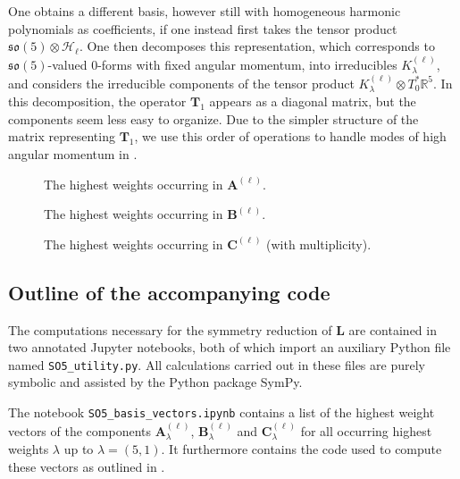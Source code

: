 \documentclass[11pt,reqno]{amsart}
\theoremstyle{remark}
\theoremstyle{definition}
\newcommand{\sov}{\mathfrak{so}(5)}
\begin{document}
One obtains a different basis, however still with homogeneous harmonic polynomials as coefficients, if one instead first takes the tensor product $\sov \otimes \mathcal H_\ell$. One then decomposes this representation, which corresponds to $\sov$-valued $0$-forms with fixed angular momentum, into irreducibles $K^{(\ell)}_\lambda$, and considers the irreducible components of the tensor product $K^{(\ell)}_\lambda \otimes T^\ast_0 \mathbb R^5$. In this decomposition, the operator $\mathbf T_1$ appears as a diagonal matrix, but the components seem less easy to organize. Due to the simpler structure of the matrix representing $\mathbf T_1$, we use this order of operations to handle modes of high angular momentum in .


\begin{figure}[t]
    \centering
    
    \caption{The highest weights occurring in $\mathbf A^{(\ell)}$.}
    \label{fig:A_d}
\end{figure}

\begin{figure}[t]
    \centering
    
    \caption{The highest weights occurring in $\mathbf B^{(\ell)}$.}
    \label{fig:B_d}
\end{figure}

\begin{figure}[t]
    \centering
    
    \caption{The highest weights occurring in $\mathbf C^{(\ell)}$ (with multiplicity).}
    \label{fig:C_d}
\end{figure}

\subsection{Outline of the accompanying code}

The computations necessary for the symmetry reduction of $\mathbf L$ are contained in two annotated Jupyter notebooks, both of which import an auxiliary Python file named \texttt{SO5\_utility.py}. All calculations carried out in these files are purely symbolic and assisted by the Python package SymPy.

The notebook \texttt{SO5\_basis\_vectors.ipynb} contains a list of the highest weight vectors of the components $\mathbf A^{(\ell)}_\lambda$, $\mathbf B^{(\ell)}_\lambda$ and $\mathbf C^{(\ell)}_\lambda$ for all occurring highest weights $\lambda$ up to $\lambda = (5,1)$. It furthermore contains the code used to compute these vectors as outlined in .
\end{document}
